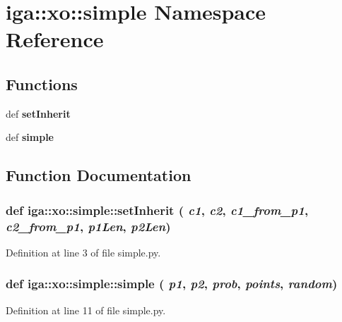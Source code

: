 \section{iga::xo::simple Namespace Reference}
\label{namespaceiga_1_1xo_1_1simple}


\subsection*{Functions}
\begin{CompactItemize}
\item 
def {\bf setInherit}
\item 
def {\bf simple}
\end{CompactItemize}


\subsection{Function Documentation}
\subsubsection{\setlength{\rightskip}{0pt plus 5cm}def iga::xo::simple::setInherit ( {\em c1},  {\em c2},  {\em c1\_\-from\_\-p1},  {\em c2\_\-from\_\-p1},  {\em p1Len},  {\em p2Len})}\label{namespaceiga_1_1xo_1_1simple_e3d062a2e0a37037b895b7f171e48827}




Definition at line 3 of file simple.py.
\subsubsection{\setlength{\rightskip}{0pt plus 5cm}def iga::xo::simple::simple ( {\em p1},  {\em p2},  {\em prob},  {\em points},  {\em random})}\label{namespaceiga_1_1xo_1_1simple_e2a419e893d27097c03c8c65705ecdea}




Definition at line 11 of file simple.py.